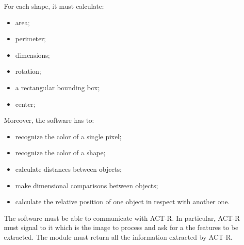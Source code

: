 		For each shape, it must calculate:
		\begin{itemize}
		    	\item area;
		    	\item perimeter;
			\item dimensions;
			\item rotation;
			\item a rectangular bounding box;
			\item center;
		\end{itemize}

		Moreover, the software has to:
		\begin{itemize}
			\item recognize the color of a single pixel;
			\item recognize the color of a shape;
		    	\item calculate distances between objects;			
			\item make dimensional comparisons between objects;
			\item calculate the relative position of one object in respect with another one.
		\end{itemize}

		The software must be able to communicate with ACT-R. 
		In particular, ACT-R must signal to it which is the image to process and ask for a the features to be extracted. The module must return all the information extracted by ACT-R.

